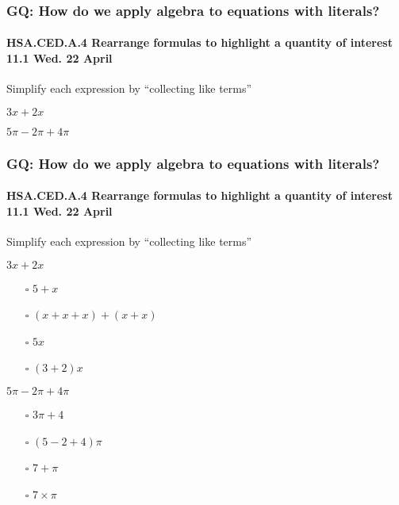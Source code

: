 \documentclass{beamer}
\begin{document}
\frame
{
  \frametitle{GQ: How do we apply algebra to equations with literals?}
  \framesubtitle{HSA.CED.A.4 Rearrange formulas to highlight a quantity of interest \hfill \alert{11.1 Wed. 22 April}}

  \Large{
  Simplify each expression by ``collecting like terms''
  
  \begin{enumerate}
    \begin{multicols}{2}
      \item $3x+2x$ \vspace{2cm}
      \item $5\pi-2\pi+4\pi$
    \end{multicols}
    \end{enumerate} \vspace{5cm}
}
}


\frame
{
  \frametitle{GQ: How do we apply algebra to equations with literals?}
  \framesubtitle{HSA.CED.A.4 Rearrange formulas to highlight a quantity of interest \hfill \alert{11.1 Wed. 22 April}}

  
  Simplify each expression by ``collecting like terms''
  
  \begin{enumerate}
    \begin{multicols}{2}
      \item $3x+2x$
      \begin{itemize}
        \item[$\square$] $5+x$
        \item[$\square$] $(x+x+x)+(x+x)$
        \item[$\square$] $5x$
        \item[$\square$] $(3+2)x$
      \end{itemize}
      \item $5\pi-2\pi+4\pi$
      \begin{itemize}
        \item[$\square$] $3\pi+4$
        \item[$\square$] $(5-2+4)\pi$
        \item[$\square$] $7+\pi$
        \item[$\square$] $7 \times \pi$
      \end{itemize}
    \end{multicols}
    \end{enumerate} \vspace{5cm}
}
\end{document}
